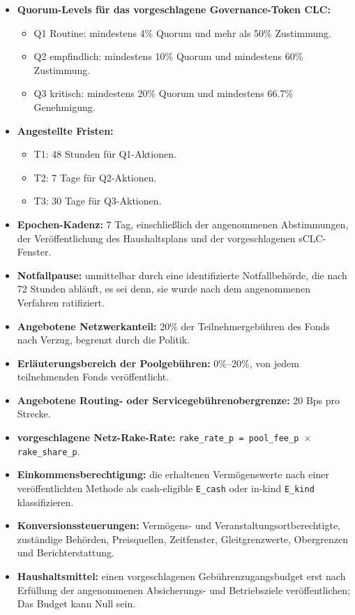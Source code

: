 \documentclass[11pt]{article}
\begin{document}
\begin{itemize}[leftmargin=*]
\item \textbf{Quorum-Levels für das vorgeschlagene Governance-Token CLC:}
\begin{itemize}[leftmargin=*]
\item Q1 Routine: mindestens 4\% Quorum und mehr als 50\% Zustimmung.
\item Q2 empfindlich: mindestens 10\% Quorum und mindestens 60\% Zustimmung.
\item Q3 kritisch: mindestens 20\% Quorum und mindestens 66.7\% Genehmigung.
\end{itemize}
\item \textbf{Angestellte Fristen:}
\begin{itemize}[leftmargin=*]
\item T1: 48 Stunden für Q1-Aktionen.
\item T2: 7 Tage für Q2-Aktionen.
\item T3: 30 Tage für Q3-Aktionen.
\end{itemize}
\item \textbf{Epochen-Kadenz:} 7 Tag, einschließlich der angenommenen Abstimmungen, der Veröffentlichung des Haushaltsplans und der vorgeschlagenen sCLC-Fenster.
\item \textbf{Notfallpause:} unmittelbar durch eine identifizierte Notfallbehörde, die nach 72 Stunden abläuft, es sei denn, sie wurde nach dem angenommenen Verfahren ratifiziert.
\item \textbf{Angebotene Netzwerkanteil:} 20\% der Teilnehmergebühren des Fonds nach Verzug, begrenzt durch die Politik.
\item \textbf{Erläuterungsbereich der Poolgebühren:} 0\%--20\%, von jedem teilnehmenden Fonds veröffentlicht.
\item \textbf{Angebotene Routing- oder Servicegebührenobergrenze:} 20 Bps pro Strecke.
\item \textbf{vorgeschlagene Netz-Rake-Rate:} \texttt{rake\_rate\_p = pool\_fee\_p $\times$ rake\_share\_p}.
\item \textbf{Einkommensberechtigung:} die erhaltenen Vermögenswerte nach einer veröffentlichten Methode als cash-eligible \texttt{E\_cash} oder in-kind \texttt{E\_kind} klassifizieren.
\item \textbf{Konversionssteuerungen:} Vermögens- und Veranstaltungsortberechtigte, zuständige Behörden, Preisquellen, Zeitfenster, Gleitgrenzwerte, Obergrenzen und Berichterstattung.
\item \textbf{Haushaltsmittel:} einen vorgeschlagenen Gebührenzugangsbudget erst nach Erfüllung der angenommenen Absicherungs- und Betriebsziele veröffentlichen; Das Budget kann Null sein.

\end{itemize}
\end{document}
